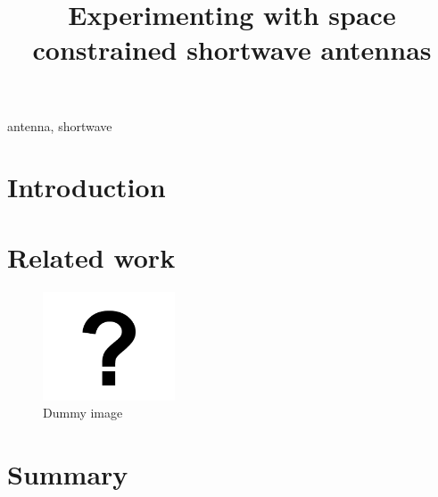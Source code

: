 \documentclass[conference]{IEEEtran}
\begin{document}
\title{Experimenting with space constrained shortwave antennas}

\author{
}

\maketitle

\begin{abstract}
\end{abstract}

\begin{IEEEkeywords}
antenna, shortwave
\end{IEEEkeywords}

\section{Introduction}


\section{Related work}

\begin{figure}[htbp]
	\centering
	\includegraphics[width=0.35\textwidth]{fig/dummy.png}
	\caption{Dummy image}
	\label{fig-dummy}
\end{figure}

\section{Summary}




\end{document}
